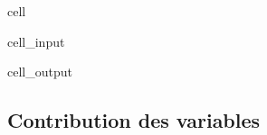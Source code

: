 \documentclass[letterpaper,10pt,english]{jupyterBook}
\begin{document}
\begin{sphinxuseclass}{cell}
\begin{sphinxVerbatimInput}
\begin{sphinxuseclass}{cell_input}
\end{sphinxuseclass}\end{sphinxVerbatimInput}
\begin{sphinxVerbatimOutput}

\begin{sphinxuseclass}{cell_output}
\noindent{}

\end{sphinxuseclass}\end{sphinxVerbatimOutput}

\end{sphinxuseclass}

\subsection{Contribution des variables}
\label{\detokenize{acp:contribution-des-variables}}
\end{document}
